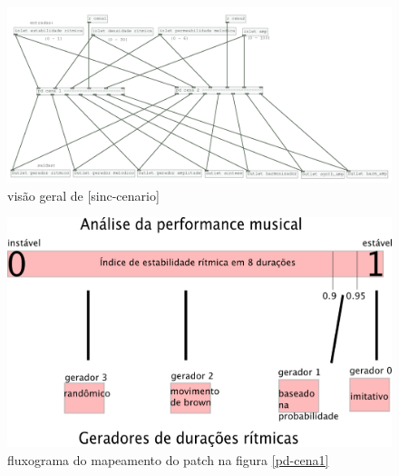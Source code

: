 \documentclass[draft]{ppgmus}
\begin{document}
\begin{figure}
\includegraphics[scale=.55]{sinc-cenario}
\caption{visão geral de [sinc-cenario]}
\label{sinc-cenario}
\end{figure}

\begin{figure}
\includegraphics[scale=.6]{tabela-cenario}
\caption{fluxograma do mapeamento do patch na figura \ref{pd-cena1}}
\label{tabela-cenario}
\end{figure}
\end{document}
